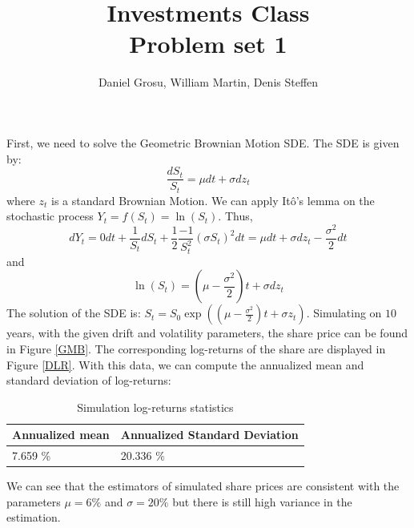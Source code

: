 \documentclass[10pt]{article}
\newenvironment{exercise}[2][Exercise]{\begin{trivlist}
  \item[\hskip \labelsep {\bfseries #1}\hskip \labelsep {\bfseries #2.}]}{\end{trivlist}}
\begin{document}
	
  \renewcommand{\qedsymbol}{\smiley}
	\title{Investments Class \\ Problem set 1}
	\author{Daniel Grosu, William Martin, Denis Steffen}
	
	\maketitle

  \begin{exercise}{1}
    First, we need to solve the Geometric Brownian Motion SDE. 
    The SDE is given by: 
    $$ \frac{dS_t}{S_t} = \mu dt + \sigma dz_t$$ where $z_t$ is a standard Brownian Motion. 
    We can apply Itô's lemma on the stochastic process $Y_t = f(S_t) = \ln(S_t)$.
    Thus, $$ dY_t = 0 dt +  \frac{1}{S_t}dS_t + \frac{1}{2}\frac{-1}{S_t^2}(\sigma S_t)^2 dt = \mu dt + \sigma dz_t - \frac{\sigma^2}{2}dt$$
    and $$ \ln(S_t) = (\mu-\frac{\sigma^2}{2})t + \sigma dz_t$$
    The solution of the SDE is: $ S_t = S_0 \exp((\mu-\frac{\sigma^2}{2})t+ \sigma z_t)$.
    Simulating on $10$ years, with the given drift and volatility parameters, the share price can be found in Figure \ref{GMB}. The corresponding log-returns of the share are displayed in Figure \ref{DLR}.
    With this data, we can compute the annualized mean and standard deviation of log-returns:
    
    \begin{table}[h]
      \centering
        \begin{tabular}{|l|l|}
        \hline
        Annualized mean & Annualized Standard Deviation \\ \hline
        7.659 \%        & 20.336 \%                    \\ \hline
        \end{tabular}
        \caption{Simulation log-returns statistics}
      \end{table}
      We can see that the estimators of simulated share prices are consistent with the parameters $\mu = 6\%$ and $\sigma = 20\%$ but there is still high variance in the estimation. 


\end{exercise}
\end{document}
